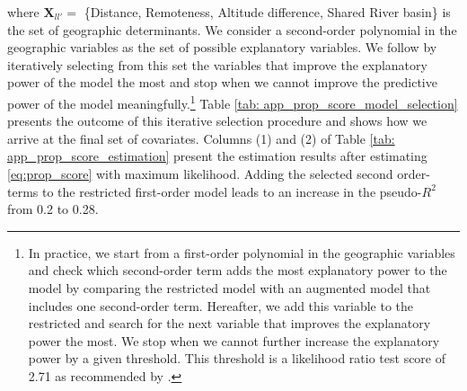 \noindent where $\boldsymbol{X}_{ll'} =$ \{Distance, Remoteness, Altitude difference, Shared River basin\} is the set of geographic determinants. We consider a second-order polynomial in the geographic variables as the set of possible explanatory variables. We follow \citet{Imbens2015} by iteratively selecting from this set the variables that improve the explanatory power of the model the most and stop when we cannot improve the predictive power of the model meaningfully.\footnote{In practice, we start from a first-order polynomial in the geographic variables and check which second-order term adds the most explanatory power to the model by comparing the restricted model with an augmented model that includes one second-order term. Hereafter, we add this variable to the restricted and search for the next variable that improves the explanatory power the most. We stop when we cannot further increase the explanatory power by a given threshold. This threshold is a likelihood ratio test score of 2.71 as recommended by \citet{Imbens2015}.} Table \ref{tab: app_prop_score_model_selection} presents the outcome of this iterative selection procedure and shows how we arrive at the final set of covariates. Columns (1) and (2) of Table \ref{tab: app_prop_score_estimation} present the estimation results after estimating \ref{eq:prop_score} with maximum likelihood. Adding the selected second order-terms to the restricted first-order model leads to an increase in the pseudo-$R^2$ from 0.2 to 0.28. 

